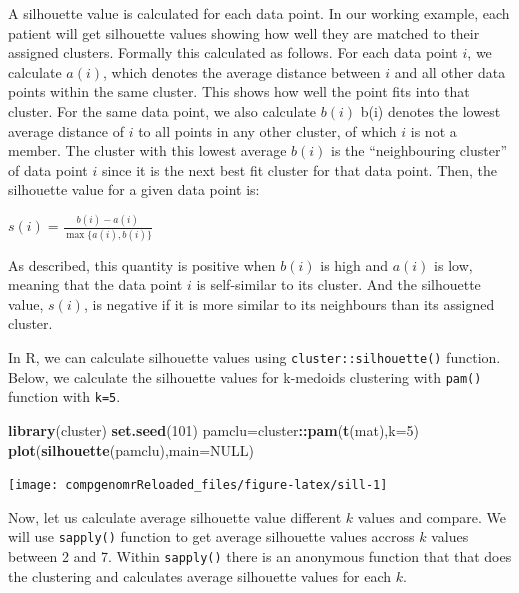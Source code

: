 \documentclass[12pt,]{krantz}
\newenvironment{Shaded}{\begin{snugshade}}{\end{snugshade}}
\newcommand{\DataTypeTok}[1]{\textcolor[rgb]{0.13,0.29,0.53}{#1}}
\newcommand{\DecValTok}[1]{\textcolor[rgb]{0.00,0.00,0.81}{#1}}
\newcommand{\KeywordTok}[1]{\textcolor[rgb]{0.13,0.29,0.53}{\textbf{#1}}}
\newcommand{\NormalTok}[1]{#1}
\newcommand{\OperatorTok}[1]{\textcolor[rgb]{0.81,0.36,0.00}{\textbf{#1}}}
\newcommand{\OtherTok}[1]{\textcolor[rgb]{0.56,0.35,0.01}{#1}}
\theoremstyle{definition}
\theoremstyle{definition}
\theoremstyle{definition}
\theoremstyle{remark}
\begin{document}
A silhouette value is calculated for each data point. In our working
example, each patient will get silhouette values showing how well they
are matched to their assigned clusters. Formally this calculated as
follows. For each data point \(i\), we calculate
\({\displaystyle a(i)}\), which denotes the average distance between
\(i\) and all other data points within the same cluster. This shows how
well the point fits into that cluster. For the same data point, we also
calculate \({\displaystyle b(i)}\) b(i) denotes the lowest average
distance of \({\displaystyle i}\) to all points in any other cluster, of
which \({\displaystyle i}\) is not a member. The cluster with this
lowest average \(b(i)\) is the ``neighbouring cluster'' of data point
\({\displaystyle i}\) since it is the next best fit cluster for that
data point. Then, the silhouette value for a given data point is:

\(s(i) = \frac{b(i) - a(i)}{\max\{a(i),b(i)\}}\)

As described, this quantity is positive when \(b(i)\) is high and
\(a(i)\) is low, meaning that the data point \(i\) is self-similar to
its cluster. And the silhouette value, \(s(i)\), is negative if it is
more similar to its neighbours than its assigned cluster.

In R, we can calculate silhouette values using
\texttt{cluster::silhouette()} function. Below, we calculate the
silhouette values for k-medoids clustering with \texttt{pam()} function
with \texttt{k=5}.

\begin{Shaded}
\begin{Highlighting}[]
\KeywordTok{library}\NormalTok{(cluster)}
\KeywordTok{set.seed}\NormalTok{(}\DecValTok{101}\NormalTok{)}
\NormalTok{pamclu=cluster}\OperatorTok{::}\KeywordTok{pam}\NormalTok{(}\KeywordTok{t}\NormalTok{(mat),}\DataTypeTok{k=}\DecValTok{5}\NormalTok{)}
\KeywordTok{plot}\NormalTok{(}\KeywordTok{silhouette}\NormalTok{(pamclu),}\DataTypeTok{main=}\OtherTok{NULL}\NormalTok{)}
\end{Highlighting}
\end{Shaded}

\begin{center}\texttt{[image: compgenomrReloaded\_files/figure-latex/sill-1]} \end{center}

Now, let us calculate average silhouette value different \(k\) values
and compare. We will use \texttt{sapply()} function to get average
silhouette values accross \(k\) values between 2 and 7. Within
\texttt{sapply()} there is an anonymous function that that does the
clustering and calculates average silhouette values for each \(k\).
\end{document}
